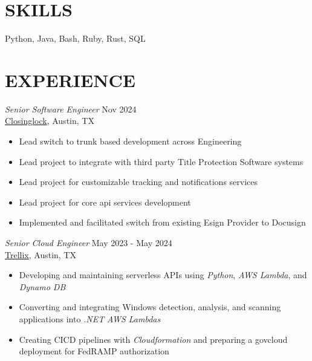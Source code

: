 \documentclass[margin, 9pt]{res} %
\begin{document}
\begin{resume}

\section{SKILLS}

Python, Java, Bash, Ruby, Rust, SQL
 
\section{EXPERIENCE}
{\sl Senior Software Engineer} \hfill Nov 2024 \\
\href{https://www.closinglock.com/}{Closinglock}, Austin, TX
\begin{itemize}
    \item Lead switch to trunk based development across Engineering
    \item Lead project to integrate with third party Title Protection Software systems
    \item Lead project for customizable tracking and notifications services
    \item Lead project for core api services development
    \item Implemented and facilitated switch from existing Esign Provider to Docusign
\end{itemize}


{\sl Senior Cloud Engineer} \hfill May 2023 - May 2024 \\
\href{https://www.trellix.com/}{Trellix}, Austin, TX
\begin{itemize}
    \item Developing and maintaining serverless APIs using {\it Python}, {\it AWS Lambda}, and {\it Dynamo DB}
    \item Converting and integrating Windows detection, analysis, and scanning applications into {\it .NET} {\it AWS Lambdas}
    \item Creating CICD pipelines with {\it Cloudformation} and preparing a govcloud deployment for FedRAMP authorization
\end{itemize}



\end{resume}
\end{document}
